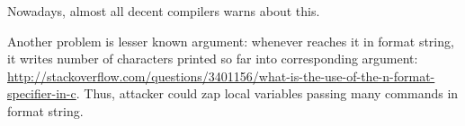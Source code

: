 Nowadays, almost all decent compilers warns about this.

Another problem is lesser known  \printf argument: whenever \printf reaches it in format string, it writes
number of characters printed so far into corresponding argument:
\url{http://stackoverflow.com/questions/3401156/what-is-the-use-of-the-n-format-specifier-in-c}.
Thus, attacker could zap local variables passing many  commands in format string.

